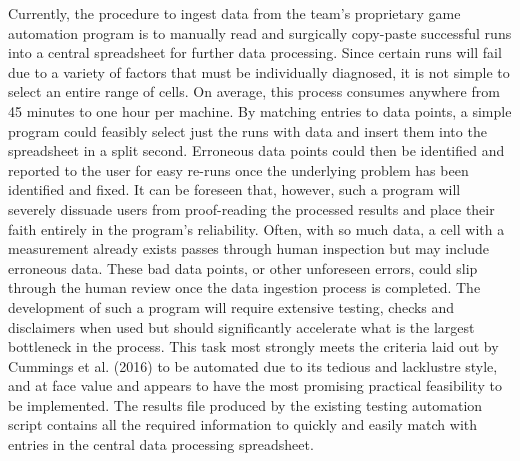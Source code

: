 \documentclass[12pt]{article}
\begin{document}
\indent\hspace{0.5in} Currently, the procedure to ingest data from the team’s proprietary game automation program is to manually read and surgically copy-paste successful runs into a central spreadsheet for further data processing. Since certain runs will fail due to a variety of factors that must be individually diagnosed, it is not simple to select an entire range of cells. On average, this process consumes anywhere from 45 minutes to one hour per machine. By matching entries to data points, a simple program could feasibly select just the runs with data and insert them into the spreadsheet in a split second. Erroneous data points could then be identified and reported to the user for easy re-runs once the underlying problem has been identified and fixed. It can be foreseen that, however, such a program will severely dissuade users from proof-reading the processed results and place their faith entirely in the program's reliability. Often, with so much data, a cell with a measurement already exists passes through human inspection but may include erroneous data. These bad data points, or other unforeseen errors, could slip through the human review once the data ingestion process is completed. The development of such a program will require extensive testing, checks and disclaimers when used but should significantly accelerate what is the largest bottleneck in the process. This task most strongly meets the criteria laid out by Cummings et al. (2016) to be automated due to its tedious and lacklustre style, and at face value and appears to have the most promising practical feasibility to be implemented. The results file produced by the existing testing automation script contains all the required information to quickly and easily match with entries in the central data processing spreadsheet.
\end{document}
